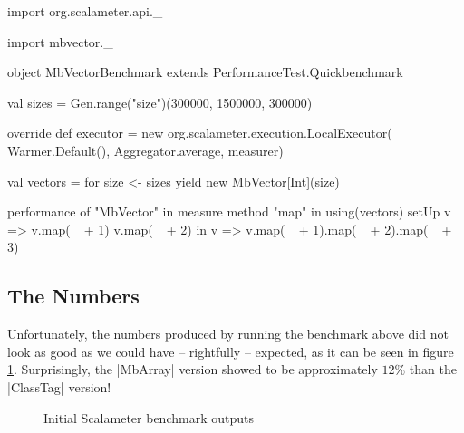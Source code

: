 \begin{lstlisting-nobreak}
import org.scalameter.api._

import mbvector._

object MbVectorBenchmark extends PerformanceTest.Quickbenchmark {
  val sizes = Gen.range("size")(300000, 1500000, 300000)

  override def executor = new org.scalameter.execution.LocalExecutor(
    Warmer.Default(),
    Aggregator.average,
    measurer)

  val vectors = for {
    size <- sizes
  } yield new MbVector[Int](size)

  performance of "MbVector" in {
    measure method "map" in {
      using(vectors) setUp {
        v => 
          v.map(_ + 1)
          v.map(_ + 2)
      } in {
        v => v.map(_ + 1).map(_ + 2).map(_ + 3)
      }
    }
  }
}
\end{lstlisting-nobreak}

\subsection{The Numbers}

Unfortunately, the numbers produced by running the benchmark above did not look as good as we could have -- rightfully -- expected, as it can be seen in figure \ref{fig:InitCTvsMB}.
Surprisingly, the |MbArray| version showed to be approximately $12\%$ than the |ClassTag| version!

\begin{figure}
\centering
{}
\caption{Initial Scalameter benchmark outputs}\label{fig:BenchOuts}
\label{fig:InitCTvsMB}
\end{figure} 


